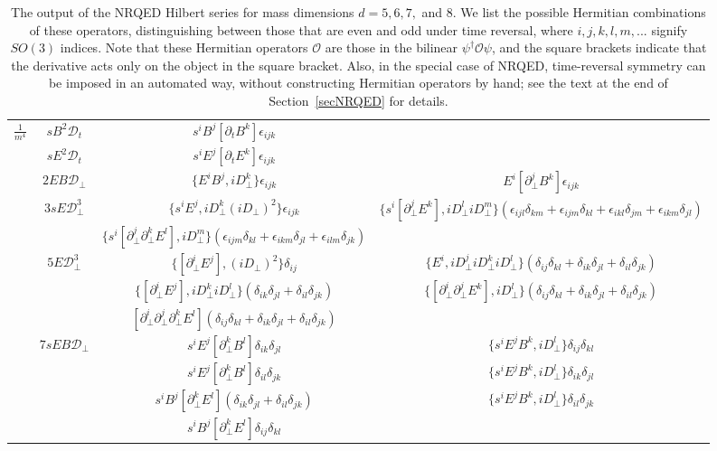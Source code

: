 \documentclass[prd,onecolumn, nofootinbib, 11pt]{revtex4}
\newcommand{\iD}{iD_\perp}
\newcommand{\p}{\partial_\perp}
\begin{document}
\begin{table}[h!tbp]
{\begin{tabular}{| c | c | c | c |}
\multirow{16}{*}{$\frac{1}{m^4}$} & $sB^2 \mathcal{D}_t$ & $s^i B^j [\partial_t B^k] \epsilon_{ijk}$ &  \\  \cline{2-4}
						  & $sE^2 \mathcal{D}_t$ & $s^i E^j [\partial_t E^k] \epsilon_{ijk}$ &  \\  \cline{2-4}
						  & $2 EB\mathcal{D}_\perp$ & $\{ E^i B^j, \iD^k \}\epsilon_{ijk}$ & $E^i [\p^j B^k]\epsilon_{ijk}$ \\  \cline{2-4} 
						  & \multirow{2}{*}{$3sE \mathcal{D}_\perp^3$} & $\{ s^i E^j, \iD^k (\iD)^2 \}\epsilon_{ijk}$ & $\{ s^i [\p^j E^k], \iD^l \iD^m \}(\epsilon_{ijl}\delta_{km} + \epsilon_{ijm}\delta_{kl}+\epsilon_{ikl}\delta_{jm}+\epsilon_{ikm}\delta_{jl})$ \\
												     & & $\{ s^i [\p^j \p^k E^l], \iD^m\}(\epsilon_{ijm}\delta_{kl}+\epsilon_{ikm}\delta_{jl}+\epsilon_{ilm}\delta_{jk})$ & \\ \cline{2-4} 
						  & \multirow{3}{*}{$5E \mathcal{D}_\perp^3$} & $\{ [\p^i E^j], (\iD)^2 \}\delta_{ij}$ & $\{ E^i, \iD^j \iD^k \iD^l \}(\delta_{ij}\delta_{kl}+\delta_{ik}\delta_{jl}+\delta_{il}\delta_{jk})$ \\
						  						    & &  $\{ [\p^i E^j], \iD^k \iD^l \}(\delta_{ik}\delta_{jl}+\delta_{il}\delta_{jk})$ & $\{ [\p^i \p^j E^k], \iD^l\}(\delta_{ij}\delta_{kl}+\delta_{ik}\delta_{jl}+\delta_{il}\delta_{jk})$ \\
						  						    & &  $[\p^i \p^j \p^k E^l](\delta_{ij}\delta_{kl}+\delta_{ik}\delta_{jl}+\delta_{il}\delta_{jk})$ &  \\  \cline{2-4} 
						  & \multirow{4}{*}{$7sEB \mathcal{D}_\perp$} & $s^i E^j [\p^k B^l]\delta_{ik}\delta_{jl}$ & $\{ s^i E^j B^k, \iD^l\} \delta_{ij} \delta_{kl} $ \\
						  						    & & $s^i E^j [\p^k B^l]\delta_{il}\delta_{jk}$ & $\{ s^i E^j B^k, \iD^l\} \delta_{ik} \delta_{jl} $ \\	
												    & & $s^i B^j [\p^k E^l] (\delta_{ik}\delta_{jl}+\delta_{il}\delta_{jk})$ & $\{ s^i E^j B^k, \iD^l\} \delta_{il} \delta_{jk} $ \\	
												    & & $s^i B^j [\p^k E^l] \delta_{ij}\delta_{kl}$ & \\	 \hline					    
						  
\end{tabular}
}
\caption{The output of the NRQED Hilbert series for mass dimensions $d=5, 6, 7,$ and 8.  We list the possible Hermitian combinations of these operators, distinguishing between those that are even and odd under time reversal, where $i,j,k,l,m,...$ signify $SO(3)$ indices.  Note that these Hermitian operators $\mathcal{O}$ are those in the bilinear $\psi^\dagger \mathcal{O}\psi$, and the square brackets indicate that the derivative acts only on the object in the square bracket.  Also, in the special case of NRQED, time-reversal symmetry can be imposed in an automated way, without constructing Hermitian operators by hand; see the text at the end of Section~\ref{secNRQED} for details.   }
\label{NRQED}
\end{table}
\end{document}
